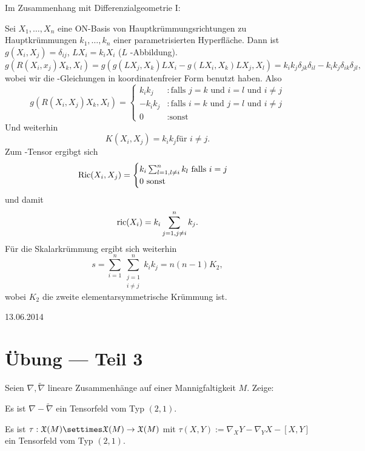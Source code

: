 \documentclass{article}
\begin{document}
Im Zusammenhang mit Differenzialgeometrie I:

Sei $X_1,\ldots,X_n$ eine ON-Basis von Hauptkrümmungsrichtungen zu Hauptkrümmungen $k_1,\ldots,k_n$ einer parametrisierten Hyperfläche. Dann ist $g(X_i,X_j)=\delta_{ij}$, $LX_i=k_i X_i$ ($L$ -Abbildung).
$$
g(R(X_i,x_j)X_k,X_l)=g(g(LX_j,X_k)LX_i-g(LX_i,X_k)LX_j,X_l)=k_ik_j\delta_{jk}\delta_{il}-k_ik_j\delta_{ik}\delta_{jl},
$$
wobei wir die -Gleichungen in koordinatenfreier Form benutzt haben.
Also
$$
g(R(X_i,X_j)X_k,X_l)=
\begin{cases}
    k_i k_j&: \textrm{falls $j=k$ und $i=l$ und $i\neq j$}\\
    -k_i k_j&: \textrm{falls $i=k$ und $j=l$ und $i\neq j$}\\
        0&:\textrm{sonst}
\end{cases}
$$
Und weiterhin
$$
K(X_i,X_j)=k_i k_j \textrm{für $i\neq j$}. 
$$
Zum -Tensor ergibgt sich
$$
\mathop\mathrm{Ric}(X_i,X_j)=
\begin{cases}
    k_i\sum_{l=1, l\neq i}^n{k_l}\ \textrm{falls $i=j$}\\
    0\ \textrm{sonst}
\end{cases}
$$
und damit
$$
\mathop\mathrm{ric}(X_i)=k_i\sum_{j=1,j\neq i}^n{k_j}.
$$
Für die Skalarkrümmung ergibt sich weiterhin
$$
s=\sum_{i=1}^n\sum_{\substack{j=1\\ i\neq j}}^n{k_i k_j}=n(n-1)K_2,
$$
wobei $K_2$ die zweite elementarsymmetrische Krümmung ist.

\hfill{13.06.2014}

\section{Übung --- Teil 3}

\begin{exercise}
    Seien $\nabla, \tilde\nabla$ lineare Zusammenhänge auf einer Mannigfaltigkeit $M$. Zeige:
    \begin{tasks}
            \item Es ist $\nabla - \tilde\nabla$ ein Tensorfeld vom Typ $(2,1)$.
        \item Es ist $\tau:\fkX(M)\settimes\fkX(M)\to\fkX(M)$ mit $\tau(X,Y):=\nabla_X Y - \nabla_Y X - [X,Y]$ ein Tensorfeld vom Typ $(2,1)$.
    \end{tasks}
\end{exercise}
\end{document}
